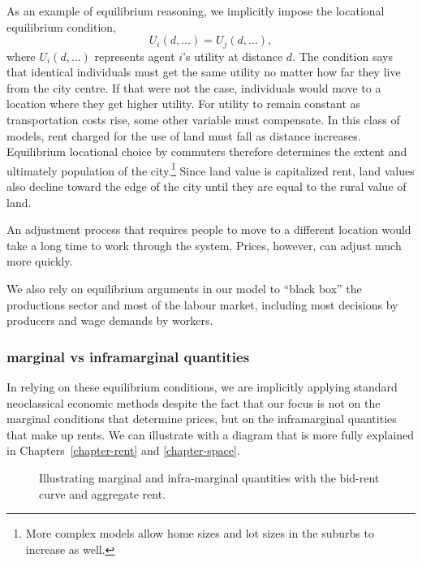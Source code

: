 As an example of \gls{equilibrium reasoning},  we implicitly impose the locational equilibrium condition,
\[U_i(d,\dots)=U_j(d, \dots),\]where $U_i(d,\dots)$ represents agent $i$'s utility at distance $d$. 
The condition says that identical individuals must get the same utility no matter how far they live from the city centre. If that were not the case, individuals would move to a location where they get higher utility. For utility to remain constant as  transportation costs  rise, some other variable must compensate. In this class of models, rent charged for the use of land must fall as distance increases. Equilibrium locational choice by commuters therefore determines the extent and ultimately  population of the city.\footnote{More complex models allow home sizes and lot sizes in the suburbs to increase as well.} Since land value  is \gls{capitalize}d rent, land values also decline toward the edge of the city until they are equal to the rural value of land. 

An adjustment process that requires people to move to a different location would take a long time to work through the system. Prices, however, can adjust much more quickly.




We also rely on equilibrium arguments in our model to ``black box'' the productions sector and most of  the labour market, including most decisions by producers and wage demands by workers. 


\subsubsection{\Gls{marginal} vs \gls{inframarginal} quantities}
In relying on these equilibrium conditions, we are implicitly applying standard neoclassical economic methods despite the fact that our focus is not on the \gls{marginal} conditions that determine prices, but on the \gls{inframarginal} quantities that make up rents. We can illustrate with a diagram that is more fully explained in Chapters~\ref{chapter-rent} and \ref{chapter-space}. 

\begin{figure}[h!t!]
\centering

\caption{Illustrating marginal and infra-marginal quantities with the bid-rent curve and aggregate rent.}
\label{fig-land-rent-as-inframarginal}
\end{figure}


